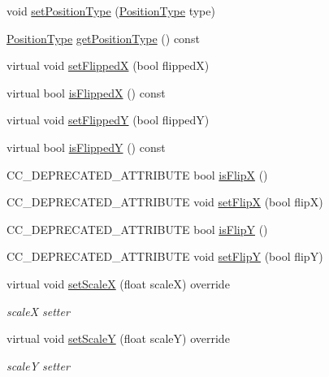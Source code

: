 \begin{DoxyCompactItemize}
\item 
void \hyperlink{classui_1_1Widget_a243b1fe9cb8b404e0c79176a0a36d10d}{set\+Position\+Type} (\hyperlink{classui_1_1Widget_acfb8004ec169575dab6d3e8eb3e92b90}{Position\+Type} type)
\item 
\hyperlink{classui_1_1Widget_acfb8004ec169575dab6d3e8eb3e92b90}{Position\+Type} \hyperlink{classui_1_1Widget_a5169e45d16e1aa2c6d692939882b1879}{get\+Position\+Type} () const
\item 
virtual void \hyperlink{classui_1_1Widget_adeffb95b64ba85db92cc533457883194}{set\+FlippedX} (bool flippedX)
\item 
virtual bool \hyperlink{classui_1_1Widget_aa21dc6a63ebb20bc0dc78293d0f03256}{is\+FlippedX} () const
\item 
virtual void \hyperlink{classui_1_1Widget_add1302904325f3784a02d29e29f83c94}{set\+FlippedY} (bool flippedY)
\item 
virtual bool \hyperlink{classui_1_1Widget_a25f551f2348e0f7b953d682045b10325}{is\+FlippedY} () const
\item 
C\+C\+\_\+\+D\+E\+P\+R\+E\+C\+A\+T\+E\+D\+\_\+\+A\+T\+T\+R\+I\+B\+U\+TE bool \hyperlink{classui_1_1Widget_a21bb179e181b815212a32d4ab5b53f93}{is\+FlipX} ()
\item 
C\+C\+\_\+\+D\+E\+P\+R\+E\+C\+A\+T\+E\+D\+\_\+\+A\+T\+T\+R\+I\+B\+U\+TE void \hyperlink{classui_1_1Widget_a0bcb34000f6bfc5d11ee5ab9ba3da08d}{set\+FlipX} (bool flipX)
\item 
C\+C\+\_\+\+D\+E\+P\+R\+E\+C\+A\+T\+E\+D\+\_\+\+A\+T\+T\+R\+I\+B\+U\+TE bool \hyperlink{classui_1_1Widget_aff62decd50746935b04665e656678d7b}{is\+FlipY} ()
\item 
C\+C\+\_\+\+D\+E\+P\+R\+E\+C\+A\+T\+E\+D\+\_\+\+A\+T\+T\+R\+I\+B\+U\+TE void \hyperlink{classui_1_1Widget_a89ae260075d6faacc1b7d76734f8f4d4}{set\+FlipY} (bool flipY)
\item 
virtual void \hyperlink{classui_1_1Widget_a7163529b3d2f436adec05d3ae6c3cb75}{set\+ScaleX} (float scaleX) override
\begin{DoxyCompactList}\small\item\em scaleX setter \end{DoxyCompactList}\item 
virtual void \hyperlink{classui_1_1Widget_acac2f88e6a4fb013377bc981a4a10c57}{set\+ScaleY} (float scaleY) override
\begin{DoxyCompactList}\small\item\em scaleY setter \end{DoxyCompactList}\item 

\end{DoxyCompactItemize}
